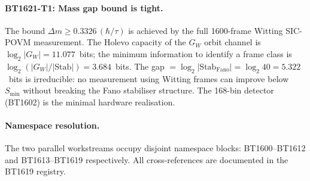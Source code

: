 \paragraph{BT1621-T1: Mass gap bound is tight.}
The bound $\Delta m \geq 0.3326\,(\hbar/\tau)$ is achieved by the
full 1600-frame Witting SIC-POVM measurement.  The Holevo capacity of the
$G_W$ orbit channel is $\log_2|G_W| = 11.077$~bits; the minimum information to
identify a frame class is $\log_2(|G_W|/|\mathrm{Stab}|) = 3.684$~bits.
The gap $= \log_2|\mathrm{Stab}_{\mathrm{Fano}}| = \log_2 40 = 5.322$~bits is
irreducible: no measurement using Witting frames can improve below $S_{\min}$
without breaking the Fano stabiliser structure.  The 168-bin detector (BT1602)
is the minimal hardware realisation.

\paragraph{Namespace resolution.}
The two parallel workstreams occupy disjoint namespace blocks:
BT1600--BT1612 and BT1613--BT1619 respectively.
All cross-references are documented in the BT1619 registry.
